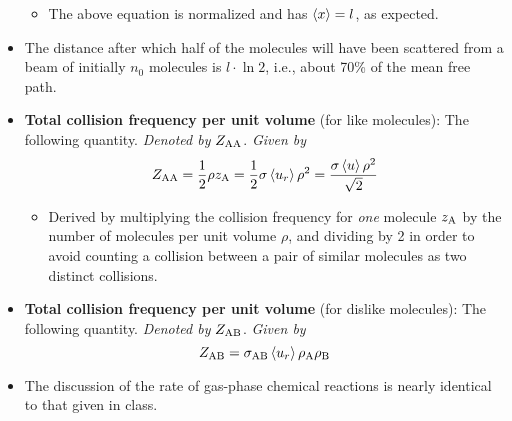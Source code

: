 \documentclass[../notes.tex]{subfiles}
\begin{document}
\begin{itemize}
\begin{itemize}
        \item The above equation is normalized and has $\left\langle{x}\right\rangle=l$, as expected.
    \end{itemize}
    \item The distance after which half of the molecules will have been scattered from a beam of initially $n_0$ molecules is $l\cdot\ln 2$, i.e., about 70\% of the mean free path.
    \item \textbf{Total collision frequency per unit volume} (for like molecules): The following quantity. \emph{Denoted by} $Z_{\ce{A}\ce{A}}$. \emph{Given by}
    \begin{equation*}
        Z_{\ce{A}\ce{A}} = \frac{1}{2}\rho z_{\ce{A}}
        = \frac{1}{2}\sigma\prb{u_r}\rho^2
        = \frac{\sigma\prb{u}\rho^2}{\sqrt{2}}
    \end{equation*}
    \begin{itemize}
        \item Derived by multiplying the collision frequency for \emph{one} molecule $z_{\ce{A}}$ by the number of molecules per unit volume $\rho$, and dividing by 2 in order to avoid counting a collision between a pair of similar molecules as two distinct collisions.
    \end{itemize}
    \item \textbf{Total collision frequency per unit volume} (for dislike molecules): The following quantity. \emph{Denoted by} $Z_{\ce{A}\ce{B}}$. \emph{Given by}
    \begin{equation*}
        Z_{\ce{A}\ce{B}} = \sigma_{\ce{A}\ce{B}}\prb{u_r}\rho_{\ce{A}}\rho_{\ce{B}}
    \end{equation*}
    \item The discussion of the rate of gas-phase chemical reactions is nearly identical to that given in class.
\end{itemize}
\end{document}
